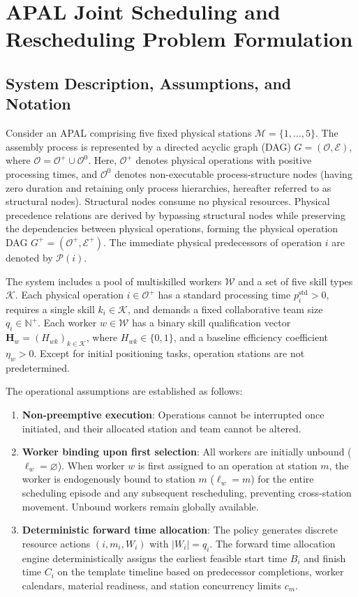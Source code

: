 \documentclass[journal,10pt]{IEEEtran}
\begin{document}
\section{APAL Joint Scheduling and Rescheduling Problem Formulation}\label{sec:formulation}

\subsection{System Description, Assumptions, and Notation}

Consider an APAL comprising five fixed physical stations $\mathcal{M}=\{1,\dots,5\}$. The assembly process is represented by a directed acyclic graph (DAG) $G=(\mathcal{O},\mathcal{E})$, where $\mathcal{O}=\mathcal{O}^+\cup\mathcal{O}^0$. Here, $\mathcal{O}^+$ denotes physical operations with positive processing times, and $\mathcal{O}^0$ denotes non-executable process-structure nodes (having zero duration and retaining only process hierarchies, hereafter referred to as structural nodes). Structural nodes consume no physical resources. Physical precedence relations are derived by bypassing structural nodes while preserving the dependencies between physical operations, forming the physical operation DAG $G^+=(\mathcal{O}^+,\mathcal{E}^+)$. The immediate physical predecessors of operation $i$ are denoted by $\mathcal{P}(i)$.

The system includes a pool of multiskilled workers $\mathcal{W}$ and a set of five skill types $\mathcal{K}$. Each physical operation $i\in\mathcal{O}^+$ has a standard processing time $p_i^{\mathrm{std}}>0$, requires a single skill $k_i\in\mathcal{K}$, and demands a fixed collaborative team size $q_i\in\mathbb{N}^+$. Each worker $w\in\mathcal{W}$ has a binary skill qualification vector $\mathbf{H}_w=(H_{wk})_{k\in\mathcal{K}}$, where $H_{wk}\in\{0,1\}$, and a baseline efficiency coefficient $\eta_w>0$. Except for initial positioning tasks, operation stations are not predetermined.

The operational assumptions are established as follows:
\begin{enumerate}
\item \textbf{Non-preemptive execution}: Operations cannot be interrupted once initiated, and their allocated station and team cannot be altered.
\item \textbf{Worker binding upon first selection}: All workers are initially unbound ($\ell_w=\varnothing$). When worker $w$ is first assigned to an operation at station $m$, the worker is endogenously bound to station $m$ ($\ell_w=m$) for the entire scheduling episode and any subsequent rescheduling, preventing cross-station movement. Unbound workers remain globally available.
\item \textbf{Deterministic forward time allocation}: The policy generates discrete resource actions $(i, m_i, W_i)$ with $|W_i|=q_i$. The forward time allocation engine deterministically assigns the earliest feasible start time $B_i$ and finish time $C_i$ on the template timeline based on predecessor completions, worker calendars, material readiness, and station concurrency limits $c_m$.
\end{enumerate}
\end{document}

